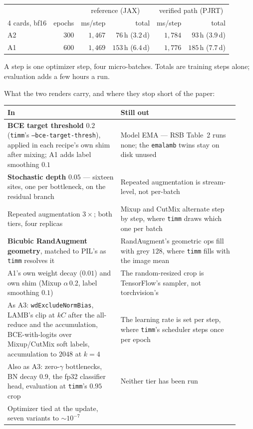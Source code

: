 \begin{center}
\begin{tabular}{@{}l r r r r r@{}}
\hline
 & & \multicolumn{2}{c}{reference (JAX)} & \multicolumn{2}{c}{verified path (PJRT)} \\
4 cards, bf16 & epochs & ms/step & total & ms/step & total \\
\hline
A2 & $300$ & $1{,}467$ & $76$\,h \;($3.2$\,d)  & $1{,}784$ & $93$\,h \;($3.9$\,d) \\
A1 & $600$ & $1{,}469$ & $153$\,h \;($6.4$\,d) & $1{,}776$ & $185$\,h \;($7.7$\,d) \\
\hline
\end{tabular}
\end{center}

\noindent A step is one optimizer step, four micro-batches. Totals are
training steps alone; evaluation adds a few hours a run.

\medskip\noindent What the two renders carry, and where they stop short of
the paper:

\begin{center}
\begin{tabular}{@{}p{0.45\linewidth} p{0.47\linewidth}@{}}
\hline
In & Still out \\
\hline
\textbf{BCE target threshold} $0.2$ (\texttt{timm}'s \texttt{--bce-target-thresh}), applied in each recipe's own shim after mixing; A1 adds label smoothing $0.1$
  & Model EMA --- RSB Table~2 runs none; the \texttt{emalamb} twins stay on disk unused \\[2pt]
\textbf{Stochastic depth} $0.05$ --- sixteen sites, one per bottleneck, on the residual branch
  & Repeated augmentation is stream-level, not per-batch \\[2pt]
Repeated augmentation $3\times$; both tiers, four replicas
  & Mixup and CutMix alternate step by step, where \texttt{timm} draws which one per batch \\[2pt]
\textbf{Bicubic RandAugment geometry}, matched to PIL's as \texttt{timm} resolves it
  & RandAugment's geometric ops fill with grey $128$, where \texttt{timm} fills with the image mean \\[2pt]
A1's own weight decay ($0.01$) and own shim (Mixup $\alpha\,0.2$, label smoothing $0.1$)
  & The random-resized crop is TensorFlow's sampler, not torchvision's \\[2pt]
As A3: \texttt{wdExcludeNormBias}, LAMB's clip at $kC$ after the all-reduce and the accumulation, BCE-with-logits over Mixup/CutMix soft labels, accumulation to $2048$ at $k=4$
  & The learning rate is set per step, where \texttt{timm}'s scheduler steps once per epoch \\[2pt]
Also as A3: zero-$\gamma$ bottlenecks, BN decay $0.9$, the fp32 classifier head, evaluation at \texttt{timm}'s $0.95$ crop
  & Neither tier has been run \\[2pt]
Optimizer tied at the update, seven variants to ${\sim}10^{-7}$ & \\
\hline
\end{tabular}
\end{center}

